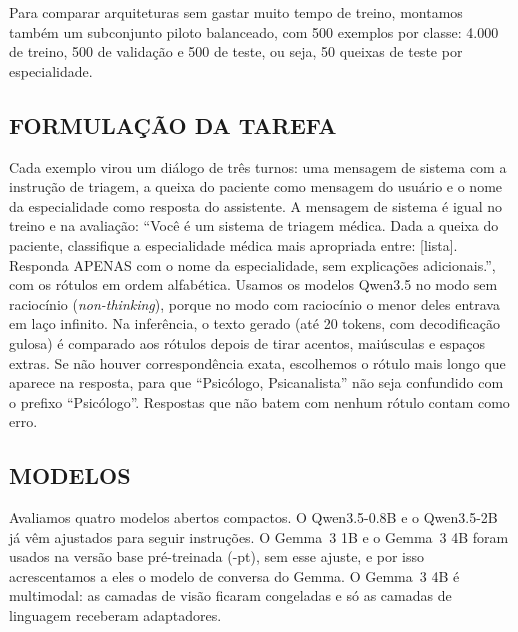\documentclass{ieeeaccess}
\begin{document}
Para comparar arquiteturas sem gastar muito tempo de treino, montamos tamb\'em um subconjunto piloto balanceado, com 500 exemplos por classe: 4.000 de treino, 500 de valida\c{c}\~ao e 500 de teste, ou seja, 50 queixas de teste por especialidade.

\subsection{FORMULA\c{C}\~AO DA TAREFA}
Cada exemplo virou um di\'alogo de tr\^es turnos: uma mensagem de sistema com a instru\c{c}\~ao de triagem, a queixa do paciente como mensagem do usu\'ario e o nome da especialidade como resposta do assistente. A mensagem de sistema \'e igual no treino e na avalia\c{c}\~ao: ``Voc\^e \'e um sistema de triagem m\'edica. Dada a queixa do paciente, classifique a especialidade m\'edica mais apropriada entre: [lista]. Responda APENAS com o nome da especialidade, sem explica\c{c}\~oes adicionais.'', com os r\'otulos em ordem alfab\'etica. Usamos os modelos Qwen3.5 no modo sem racioc\'inio (\emph{non-thinking}), porque no modo com racioc\'inio o menor deles entrava em la\c{c}o infinito. Na infer\^encia, o texto gerado (at\'e 20 tokens, com decodifica\c{c}\~ao gulosa) \'e comparado aos r\'otulos depois de tirar acentos, mai\'usculas e espa\c{c}os extras. Se n\~ao houver correspond\^encia exata, escolhemos o r\'otulo mais longo que aparece na resposta, para que ``Psic\'ologo, Psicanalista'' n\~ao seja confundido com o prefixo ``Psic\'ologo''. Respostas que n\~ao batem com nenhum r\'otulo contam como erro.

\subsection{MODELOS}
Avaliamos quatro modelos abertos compactos. O Qwen3.5-0.8B e o Qwen3.5-2B \cite{b9,b10} j\'a v\^em ajustados para seguir instru\c{c}\~oes. O Gemma~3 1B e o Gemma~3 4B \cite{b11} foram usados na vers\~ao base pr\'e-treinada (-pt), sem esse ajuste, e por isso acrescentamos a eles o modelo de conversa do Gemma. O Gemma~3 4B \'e multimodal: as camadas de vis\~ao ficaram congeladas e s\'o as camadas de linguagem receberam adaptadores.
\end{document}
